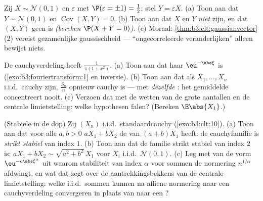 \begin{exercise}[$\star\star\star$]\label{exo:b3:clt:9}
Zij $X \sim \mathcal N(0,1)$ en $\varepsilon$  met
$\P(\varepsilon = \pm1) = \frac12$; stel $Y = \varepsilon X$.
(a) Toon aan dat $Y \sim \mathcal N(0,1)$ en
$\operatorname{Cov}(X, Y) = 0$.
(b) Toon aan dat $X$ en $Y$ \emph{niet}  zijn, en
dat $(X, Y)$ geen  is \emph{(bereken $\P(X + Y =
0)$)}.
(c) Moraal: \cref{thm:b3:clt:gaussianvector}(2) vereist
gezamenlijke gaussischheid --- ``ongecorreleerde 
veranderlijken'' alleen bewijst niets.
\end{exercise}

\begin{exercise}[$\star\star$]\label{exo:b3:clt:10}
De cauchyverdeling heeft  $\frac1{\pi(1 + x^2)}$.
(a) Toon aan dat haar  $\eu^{-\abs\xi}$ is
(\cref{exo:b3:fouriertransform:1} en inversie).
(b) Toon aan dat als $X_1, \dots, X_n$ i.i.d.\ cauchy zijn,
$\frac{S_n}n$ opnieuw cauchy is --- met \emph{dezelfde}
: het gemiddelde concentreert nooit.
(c) Verzoen dat met de wetten van de grote aantallen en de
centrale limietstelling: welke hypothesen falen? (Bereken
$\E\abs{X_1}$.)
\end{exercise}

\begin{exercise}[$\star\star$]\label{exo:b3:clt:11}
(Stabiele  in de dop) Zij $(X_n)$ i.i.d.\
standaardcauchy (\cref{exo:b3:clt:10}).
(a) Toon aan dat voor alle $a, b > 0$ $aX_1 + bX_2$ de 
van $(a + b)X_1$ heeft: de cauchyfamilie is \emph{strikt stabiel}
van index $1$.
(b) Toon aan dat de  familie strikt stabiel van index
$2$ is: $aX_1 + bX_2 \sim \sqrt{a^2 + b^2}\,X_1$ voor $X_i$
i.i.d.\ $\mathcal N(0,1)$.
(c) Leg met  van de vorm
$\eu^{-c\abs\xi^\alpha}$ uit waarom stabiliteit van index
$\alpha$ voor sommen de normering $n^{1/\alpha}$ afdwingt, en wat
dat zegt over de aantrekkingsbekkens van de centrale
limietstelling: welke i.i.d.\ sommen kunnen na affiene normering
naar een cauchyverdeling convergeren in plaats van naar een
?
\end{exercise}

